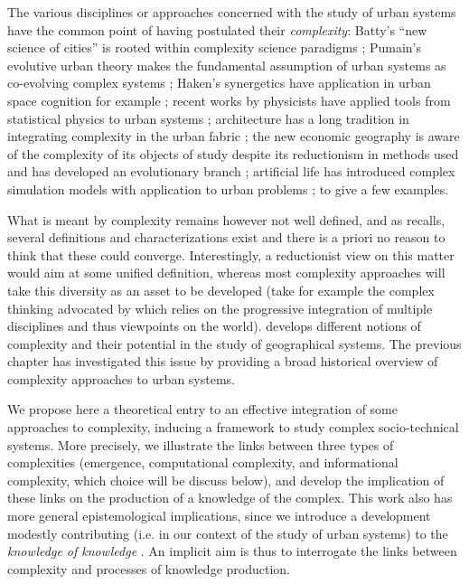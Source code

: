 The various disciplines or approaches concerned with the study of urban systems have the common point of having postulated their \emph{complexity}: Batty's ``new science of cities'' is rooted within complexity science paradigms \cite{batty2007cities,batty2013new}; Pumain's evolutive urban theory makes the fundamental assumption of urban systems as co-evolving complex systems \cite{pumain2017geography,pumain1997pour}; Haken's synergetics have application in urban space cognition for example \cite{e18060197}; recent works by physicists have applied tools from statistical physics to urban systems \cite{west2017scale}; architecture has a long tradition in integrating complexity in the urban fabric \cite{alexander1977pattern}; the new economic geography is aware of the complexity of its objects of study despite its reductionism in methods used \cite{krugman1994complex} and has developed an evolutionary branch \cite{cooke2018evolutionary}; artificial life has introduced complex simulation models with application to urban problems \cite{raimbault2014hybrid}; to give a few examples.

What is meant by complexity remains however not well defined, and as \cite{chu2008criteria} recalls, several definitions and characterizations exist and there is a priori no reason to think that these could converge. Interestingly, a reductionist view on this matter would aim at some unified definition, whereas most complexity approaches will take this diversity as an asset to be developed (take for example the complex thinking advocated by \cite{morin1991methode} which relies on the progressive integration of multiple disciplines and thus viewpoints on the world). \cite{manson2001simplifying} develops different notions of complexity and their potential in the study of geographical systems. The previous chapter \cite{batty2018which} has investigated this issue by providing a broad historical overview of complexity approaches to urban systems. 


We propose here a theoretical entry to an effective integration of some approaches to complexity, inducing a framework to study complex socio-technical systems. More precisely, we illustrate the links between three types of complexities (emergence, computational complexity, and informational complexity, which choice will be discuss below), and develop the implication of these links on the production of a knowledge of the complex. This work also has more general epistemological implications, since we introduce a development modestly contributing (i.e. in our context of the study of urban systems) to the \emph{knowledge of knowledge} \cite{edgar1986methode}. An implicit aim is thus to interrogate the links between complexity and processes of knowledge production.


